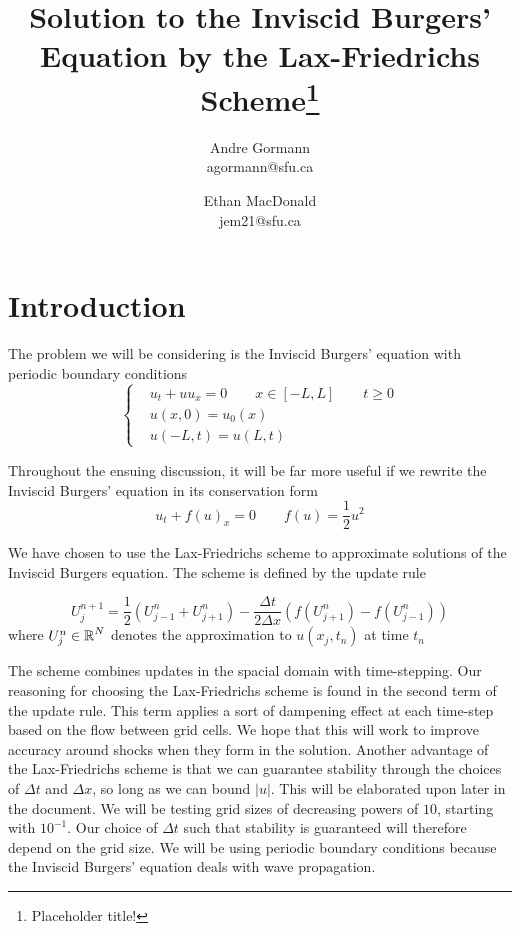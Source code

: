 \documentclass{myproject}
\title{\vspace*{-1cm}Solution to the Inviscid Burgers' Equation by the Lax-Friedrichs Scheme\footnote{Placeholder title!}}
\date{}
\author{
    Andre Gormann\\
    agormann@sfu.ca
    \and
    Ethan MacDonald\\
    jem21@sfu.ca
}
\begin{document}
\maketitle
\vspace*{-1cm}


\section{Introduction}

The problem we will be considering is the Inviscid Burgers' equation with periodic boundary conditions
\begin{equation}
    \begin{cases}
        & u_t + uu_x = 0 \qquad x \in [-L, L] \qquad t \geq 0 \\
        & u(x,0) = u_0(x) \\
        & u(-L,t) = u(L,t)
    \end{cases}
\end{equation}

Throughout the ensuing discussion, it will be far more useful if we rewrite the Inviscid Burgers' equation in its conservation form
\begin{equation}
    u_t + f(u)_x = 0 \qquad f(u) = \frac{1}{2}u^2
\end{equation}

We have chosen to use the Lax-Friedrichs scheme to approximate solutions of the Inviscid Burgers equation. The scheme is defined by the update rule

\[
    U_j^{n+1} = \frac{1}{2}\left( U_{j-1}^{n} + U_{j+1}^{n} \right) - \frac{\Delta t}{2\Delta x}\left( f(U_{j+1}^{n}) - f(U_{j-1}^{n}) \right)
\]
where $U_{j}^{n} \in \operatorname{\mathbb{R}}^N$ denotes the approximation to $u(x_j,t_n)$ at time $t_n$

The scheme combines updates in the spacial domain with time-stepping. Our reasoning for choosing the Lax-Friedrichs scheme is found in the second term of the update rule. This term applies a sort of dampening effect at each time-step based on the flow between grid cells. We hope that this will work to improve accuracy around shocks when they form in the solution. Another advantage of the Lax-Friedrichs scheme is that we can guarantee stability through the choices of ${\Delta t}$ and ${\Delta x}$, so long as we can bound $|u|$. This will be elaborated upon later in the document. We will be testing grid sizes of decreasing powers of $10$, starting with $10^{-1}$. Our choice of ${\Delta t}$ such that stability is guaranteed will therefore depend on the grid size. We will be using periodic boundary conditions because the Inviscid Burgers' equation deals with wave propagation.
\end{document}
